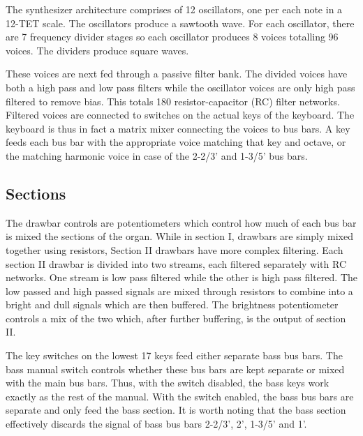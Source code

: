 \documentclass[11pt,a4paper]{article}
\begin{document}
The synthesizer architecture comprises of 12 oscillators, one per each note in a 12-TET scale. The oscillators produce a sawtooth wave. For each oscillator, there are 7 frequency divider stages so each oscillator produces 8 voices totalling 96 voices. The dividers produce square waves. 

These voices are next fed through a passive filter bank. The divided voices have both a high pass and low pass filters while the oscillator voices are only high pass filtered to remove bias. This totals 180 resistor-capacitor (RC) filter networks. Filtered voices are connected to switches on the actual keys of the keyboard. The keyboard is thus in fact a matrix mixer connecting the voices to bus bars. A key feeds each bus bar with the appropriate voice matching that key and octave, or the matching harmonic voice in case of the 2-2/3' and 1-3/5' bus bars. 

\subsection{Sections}
\label{section:sections}

The drawbar controls are potentiometers which control how much of each bus bar is mixed the sections of the organ. While in section I, drawbars are simply mixed together using resistors, Section II drawbars have more complex filtering. Each section II drawbar is divided into two streams, each filtered separately with RC networks. One stream is low pass filtered while the other is high pass filtered. The low passed and high passed signals are mixed through resistors to combine into a bright and dull signals which are then buffered. The brightness potentiometer controls a mix of the two which, after further buffering, is the output of section II. 

The key switches on the lowest 17 keys feed either separate bass bus bars. The bass manual switch controls whether these bus bars are kept separate or mixed with the main bus bars. Thus, with the switch disabled, the bass keys work exactly as the rest of the manual. With the switch enabled, the bass bus bars are separate and only feed the bass section. It is worth noting that the bass section effectively discards the signal of bass bus bars 2-2/3', 2', 1-3/5' and 1'.
\end{document}
